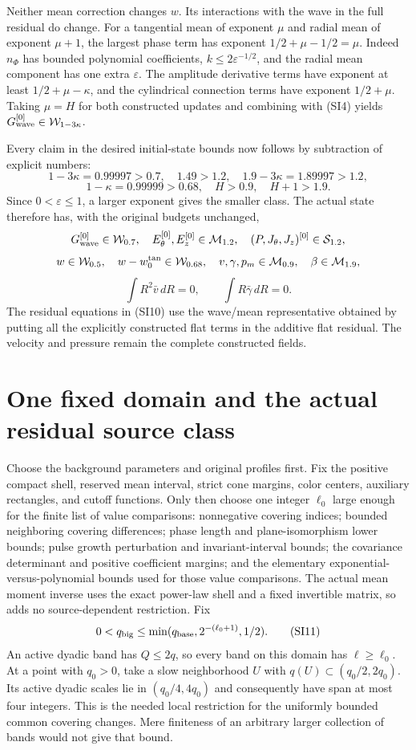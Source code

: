 \documentclass[10pt,a4paper]{article}
\begin{document}
Neither mean correction changes $w$.  Its interactions with the wave in
the full residual do change.  For a tangential mean of exponent $\mu$
and radial mean of exponent $\mu+1$, the largest phase term has exponent
$1/2+\mu-1/2=\mu$.  Indeed $n_\Phi$ has bounded polynomial coefficients,
$k\le2\varepsilon^{-1/2}$, and the radial mean component has one
extra $\varepsilon$.  The amplitude derivative terms have exponent at
least $1/2+\mu-\kappa$, and the cylindrical connection terms have
exponent $1/2+\mu$.  Taking $\mu=H$ for both constructed updates and
combining with (SI4) yields $G_{\rm wave}^{[0]}\in\mathcal W_{1-3\kappa}$.

Every claim in the desired initial-state bounds now follows by subtraction
of explicit numbers:
\[
1-3\kappa=0.99997>0.7,
\quad1.49>1.2,
\quad1.9-3\kappa=1.89997>1.2,
\]
\[
1-\kappa=0.99999>0.68,
\quad H>0.9,
\quad H+1>1.9.
\]
Since $0<\varepsilon\le1$, a larger exponent gives the smaller class.
The actual state therefore has, with the original budgets unchanged,
\[
G_{\rm wave}^{[0]}\in\mathcal W_{0.7},\quad
E_\theta^{[0]},E_z^{[0]}\in\mathcal M_{1.2},\quad
(P,J_\theta,J_z)^{[0]}\in\mathcal S_{1.2},
\]
\[
w\in\mathcal W_{0.5},\quad w-w_0^{\rm tan}\in\mathcal W_{0.68},\quad
v,\gamma,p_m\in\mathcal M_{0.9},\quad\beta\in\mathcal M_{1.9},
\]
\[
\int R^2\bar v\,dR=0,\qquad\int R\bar\gamma\,dR=0.
\tag{SI10}
\]
The residual equations in (SI10) use the wave/mean representative obtained
by putting all the explicitly constructed flat terms in the additive flat
residual.  The velocity and pressure remain the complete constructed fields.

\section{One fixed domain and the actual residual source class}

Choose the background parameters and original profiles first.  Fix the
positive compact shell, reserved mean interval, strict cone margins,
color centers, auxiliary rectangles, and cutoff functions.  Only then choose
one integer $\ell_0$ large enough for the finite list of value comparisons:
nonnegative covering indices; bounded neighboring covering differences;
phase length and plane-isomorphism lower bounds; pulse growth perturbation
and invariant-interval bounds; the covariance determinant and positive
coefficient margins; and the elementary exponential-versus-polynomial bounds
used for those value comparisons.  The actual mean moment inverse uses
the exact power-law shell and a fixed invertible matrix, so adds no
source-dependent restriction.  Fix
\[
0<q_{\rm big}\le\min(q_{\rm base},2^{-(\ell_0+1)},1/2).
\tag{SI11}
\]
An active dyadic band has $Q\le2q$, so every band on this domain has
$\ell\ge\ell_0$.  At a point with $q_0>0$, take a slow neighborhood
$U$ with $q(U)\subset(q_0/2,2q_0)$.  Its active dyadic scales lie in
$(q_0/4,4q_0)$ and consequently have span at most four integers.
This is the needed local restriction for the uniformly bounded common
covering changes.  Mere finiteness of an arbitrary larger collection of
bands would not give that bound.
\end{document}

